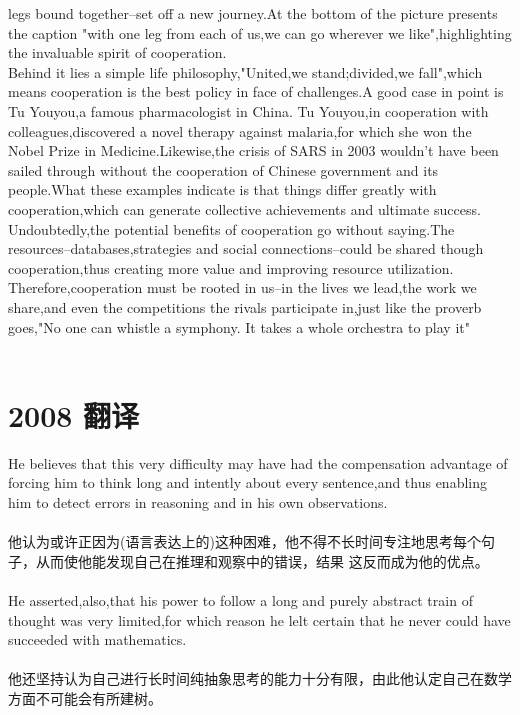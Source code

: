 \documentclass[UTF8]{article}
\begin{document}
    legs bound together--set off a new journey.At the bottom of the picture presents the caption 
    "with one leg from each of us,we can go wherever we like",highlighting the invaluable spirit of cooperation.\\
    Behind it lies a simple life philosophy,"United,we stand;divided,we fall",which means cooperation is the best policy 
    in face of challenges.A good case in point is Tu Youyou,a famous pharmacologist in China.
    Tu Youyou,in cooperation with colleagues,discovered a novel therapy against malaria,for which she won 
    the Nobel Prize in Medicine.Likewise,the crisis of SARS in 2003 wouldn't have been sailed through without 
    the cooperation of Chinese government and its people.What these examples indicate is that things differ greatly with 
    cooperation,which can generate collective achievements and ultimate success.\\
    Undoubtedly,the potential benefits of cooperation go without saying.The resources--databases,strategies and social connections--could be 
    shared though cooperation,thus creating more value and improving resource utilization.
    Therefore,cooperation must be rooted in us--in the lives we lead,the work 
    we share,and even the competitions the rivals participate in,just like the proverb goes,"No one can whistle a symphony.
    It takes a whole orchestra to play it"
    \\
    \\
    \section*{2008 翻译}
    He believes that this very difficulty may have had the compensation advantage of forcing him to think long and 
    intently about every sentence,and thus enabling him to detect errors in reasoning and in his own observations.\\
    \\
    他认为或许正因为(语言表达上的)这种困难，他不得不长时间专注地思考每个句子，从而使他能发现自己在推理和观察中的错误，结果
    这反而成为他的优点。\\
    \\

    He asserted,also,that his power to follow a long and purely abstract train of thought was very limited,for 
    which reason he lelt certain that he never could have succeeded with mathematics.\\
    \\
    他还坚持认为自己进行长时间纯抽象思考的能力十分有限，由此他认定自己在数学方面不可能会有所建树。\\
    \\
\end{document}
